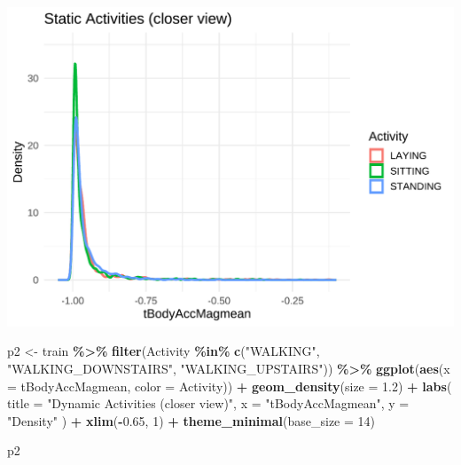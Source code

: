 \documentclass[
]{article}
\newenvironment{Shaded}{\begin{snugshade}}{\end{snugshade}}
\newcommand{\AttributeTok}[1]{\textcolor[rgb]{0.13,0.29,0.53}{#1}}
\newcommand{\DecValTok}[1]{\textcolor[rgb]{0.00,0.00,0.81}{#1}}
\newcommand{\FloatTok}[1]{\textcolor[rgb]{0.00,0.00,0.81}{#1}}
\newcommand{\FunctionTok}[1]{\textcolor[rgb]{0.13,0.29,0.53}{\textbf{#1}}}
\newcommand{\NormalTok}[1]{#1}
\newcommand{\OtherTok}[1]{\textcolor[rgb]{0.56,0.35,0.01}{#1}}
\newcommand{\SpecialCharTok}[1]{\textcolor[rgb]{0.81,0.36,0.00}{\textbf{#1}}}
\newcommand{\StringTok}[1]{\textcolor[rgb]{0.31,0.60,0.02}{#1}}
\begin{document}
\includegraphics{report_files/figure-latex/unnamed-chunk-16-1.pdf}

\begin{Shaded}
\begin{Highlighting}[]
\NormalTok{p2 }\OtherTok{\textless{}{-}}\NormalTok{ train }\SpecialCharTok{\%\textgreater{}\%}
  \FunctionTok{filter}\NormalTok{(Activity }\SpecialCharTok{\%in\%} \FunctionTok{c}\NormalTok{(}\StringTok{"WALKING"}\NormalTok{, }\StringTok{"WALKING\_DOWNSTAIRS"}\NormalTok{, }\StringTok{"WALKING\_UPSTAIRS"}\NormalTok{)) }\SpecialCharTok{\%\textgreater{}\%}
  \FunctionTok{ggplot}\NormalTok{(}\FunctionTok{aes}\NormalTok{(}\AttributeTok{x =}\NormalTok{ tBodyAccMagmean, }\AttributeTok{color =}\NormalTok{ Activity)) }\SpecialCharTok{+}
  \FunctionTok{geom\_density}\NormalTok{(}\AttributeTok{size =} \FloatTok{1.2}\NormalTok{) }\SpecialCharTok{+}
  \FunctionTok{labs}\NormalTok{(}
    \AttributeTok{title =} \StringTok{"Dynamic Activities (closer view)"}\NormalTok{,}
    \AttributeTok{x =} \StringTok{"tBodyAccMagmean"}\NormalTok{,}
    \AttributeTok{y =} \StringTok{"Density"}
\NormalTok{  ) }\SpecialCharTok{+} \FunctionTok{xlim}\NormalTok{(}\SpecialCharTok{{-}}\FloatTok{0.65}\NormalTok{, }\DecValTok{1}\NormalTok{) }\SpecialCharTok{+}
  \FunctionTok{theme\_minimal}\NormalTok{(}\AttributeTok{base\_size =} \DecValTok{14}\NormalTok{)}

\NormalTok{p2}
\end{Highlighting}
\end{Shaded}
\end{document}
